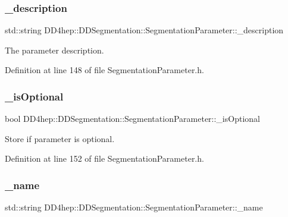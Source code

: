 \subsubsection{\texorpdfstring{\+\_\+description}{\_description}}
{\footnotesize\ttfamily std\+::string D\+D4hep\+::\+D\+D\+Segmentation\+::\+Segmentation\+Parameter\+::\+\_\+description\hspace{0.3cm}{\ttfamily [protected]}}



The parameter description. 



Definition at line 148 of file Segmentation\+Parameter.\+h.

\hypertarget{class_d_d4hep_1_1_d_d_segmentation_1_1_segmentation_parameter_a0dfb17241c0a1ed7f6a54c13ec6c9adb}{}\label{class_d_d4hep_1_1_d_d_segmentation_1_1_segmentation_parameter_a0dfb17241c0a1ed7f6a54c13ec6c9adb} 
\subsubsection{\texorpdfstring{\+\_\+is\+Optional}{\_isOptional}}
{\footnotesize\ttfamily bool D\+D4hep\+::\+D\+D\+Segmentation\+::\+Segmentation\+Parameter\+::\+\_\+is\+Optional\hspace{0.3cm}{\ttfamily [protected]}}



Store if parameter is optional. 



Definition at line 152 of file Segmentation\+Parameter.\+h.

\hypertarget{class_d_d4hep_1_1_d_d_segmentation_1_1_segmentation_parameter_a3d95d4b4814b3a5e1f15a432ca6526b1}{}\label{class_d_d4hep_1_1_d_d_segmentation_1_1_segmentation_parameter_a3d95d4b4814b3a5e1f15a432ca6526b1} 
\subsubsection{\texorpdfstring{\+\_\+name}{\_name}}
{\footnotesize\ttfamily std\+::string D\+D4hep\+::\+D\+D\+Segmentation\+::\+Segmentation\+Parameter\+::\+\_\+name\hspace{0.3cm}{\ttfamily [protected]}}



